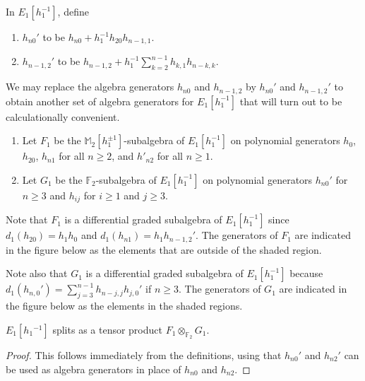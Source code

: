 \documentclass[10pt]{amsart}
\begin{document}
\begin{defn}
In $E_1[h_1^{-1}]$, define
\begin{enumerate}
\item
$h_{n0}'$ to be $h_{n0} + h_1^{-1} h_{20}h_{n-1,1}$.
\item
$h_{n-1,2}'$ to be $h_{n-1,2}+h_1^{-1}\sum_{k=2}^{n-1} h_{k,1}h_{n-k,k}$.
\end{enumerate}
\end{defn}

We may replace the algebra generators  $h_{n0}$ and $h_{n-1,2}$
by $h_{n0}'$ and $h_{n-1,2}'$  to obtain another set of algebra generators
for $E_1[h_1^{-1}]$ 
that will turn out to be calculationally convenient.

\begin{defn}
\label{defn:F1-G1}
\mbox{}
\begin{enumerate}
\item
Let $F_1$ be the ${\ensuremath{\mathbb{M}}}_2[h_1^{\pm 1}]$-subalgebra of $E_1[h_1^{-1}]$
on polynomial generators $h_0$, $h_{20}$, $h_{n1}$ for all $n \geq 2$,
and $h'_{n2}$ for all $n \geq 1$.
\item
Let $G_1$ be the 
${\ensuremath{\mathbb{F}}}_2$-subalgebra of $E_1[h_1^{-1}]$
on polynomial generators $h_{n0}'$ for $n \geq 3$ and
$h_{ij}$ for $i \geq 1$ and $j \geq 3$.
\end{enumerate}
\end{defn}

Note that $F_1$ is a differential graded subalgebra of $E_1[h_1^{-1}]$
since 
$d_1(h_{20})=h_1h_0$ and 
$d_1(h_{n1})= h_1h_{n-1,2}'$.
The generators of $F_1$ are indicated in the figure below as the elements
that are outside of the shaded region.

Note also that $G_1$ is a differential graded subalgebra of $E_1[h_1^{-1}]$
because 
$d_1(h_{n,0}') = \sum_{j=3}^{n-1} h_{n-j,j}h_{j,0}'$ 
if $n\geq 3$.
The generators of $G_1$ are indicated in the figure below as the 
elements in the shaded regions.

\begin{prop}
\label{prop:E1-split} 
$E_1[h_1{^{-1}}]$ splits as a tensor product
$F_1 \otimes_{{\ensuremath{\mathbb{F}}}_2} G_1$.
\end{prop}

\begin{proof}
This follows immediately from the definitions, using that
$h_{n0}'$ and $h_{n2}'$ can be used as algebra generators in place
of $h_{n0}$ and $h_{n2}$.
\end{proof}
\end{document}
